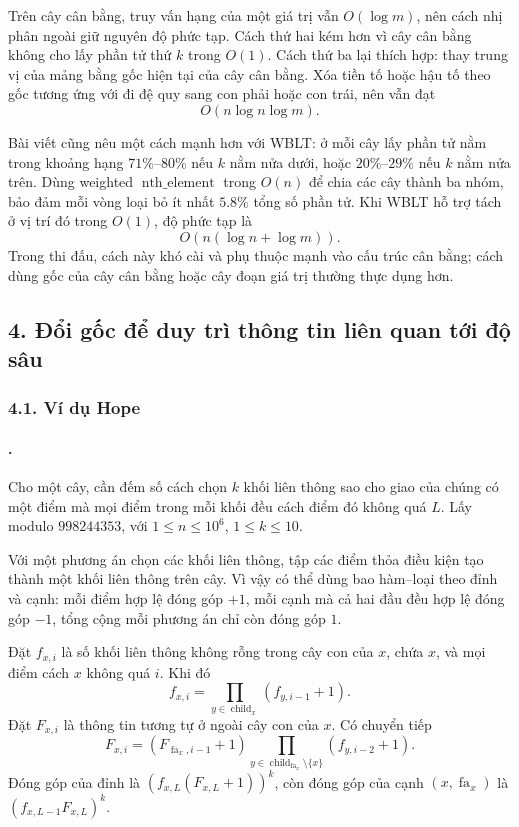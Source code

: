 \documentclass[11pt]{article}
\begin{document}
Trên cây cân bằng, truy vấn hạng của một giá trị vẫn \(O(\log m)\), nên cách
nhị phân ngoài giữ nguyên độ phức tạp. Cách thứ hai kém hơn vì cây cân bằng
không cho lấy phần tử thứ \(k\) trong \(O(1)\). Cách thứ ba lại thích hợp: thay
trung vị của mảng bằng gốc hiện tại của cây cân bằng. Xóa tiền tố hoặc hậu tố
theo gốc tương ứng với đi đệ quy sang con phải hoặc con trái, nên vẫn đạt
\[
  O(n\log n\log m).
\]

Bài viết cũng nêu một cách mạnh hơn với WBLT: ở mỗi cây lấy phần tử nằm trong
khoảng hạng \(71\%\)--\(80\%\) nếu \(k\) nằm nửa dưới, hoặc \(20\%\)--\(29\%\)
nếu \(k\) nằm nửa trên. Dùng weighted \(\operatorname{nth\_element}\) trong
\(O(n)\) để chia các cây thành ba nhóm, bảo đảm mỗi vòng loại bỏ ít nhất
\(5.8\%\) tổng số phần tử. Khi WBLT hỗ trợ tách ở vị trí đó trong \(O(1)\), độ
phức tạp là
\[
  O(n(\log n+\log m)).
\]
Trong thi đấu, cách này khó cài và phụ thuộc mạnh vào cấu trúc cân bằng; cách
dùng gốc của cây cân bằng hoặc cây đoạn giá trị thường thực dụng hơn.

\subsection*{4. Đổi gốc để duy trì thông tin liên quan tới độ sâu}

\subsubsection*{4.1. Ví dụ Hope}

\paragraph{.}
Cho một cây, cần đếm số cách chọn \(k\) khối liên thông sao cho giao của chúng
có một điểm mà mọi điểm trong mỗi khối đều cách điểm đó không quá \(L\). Lấy
modulo \(998244353\), với \(1\le n\le 10^6\), \(1\le k\le 10\).

Với một phương án chọn các khối liên thông, tập các điểm thỏa điều kiện tạo
thành một khối liên thông trên cây. Vì vậy có thể dùng bao hàm--loại theo đỉnh
và cạnh: mỗi điểm hợp lệ đóng góp \(+1\), mỗi cạnh mà cả hai đầu đều hợp lệ
đóng góp \(-1\), tổng cộng mỗi phương án chỉ còn đóng góp \(1\).

Đặt \(f_{x,i}\) là số khối liên thông không rỗng trong cây con của \(x\), chứa
\(x\), và mọi điểm cách \(x\) không quá \(i\). Khi đó
\[
  f_{x,i}=\prod_{y\in\operatorname{child}_x}(f_{y,i-1}+1).
\]
Đặt \(F_{x,i}\) là thông tin tương tự ở ngoài cây con của \(x\). Có chuyển tiếp
\[
  F_{x,i}=(F_{\operatorname{fa}_x,i-1}+1)
  \prod_{y\in\operatorname{child}_{\operatorname{fa}_x}\setminus\{x\}}
  (f_{y,i-2}+1).
\]
Đóng góp của đỉnh là \((f_{x,L}(F_{x,L}+1))^k\), còn đóng góp của cạnh
\((x,\operatorname{fa}_x)\) là \((f_{x,L-1}F_{x,L})^k\).
\end{document}

